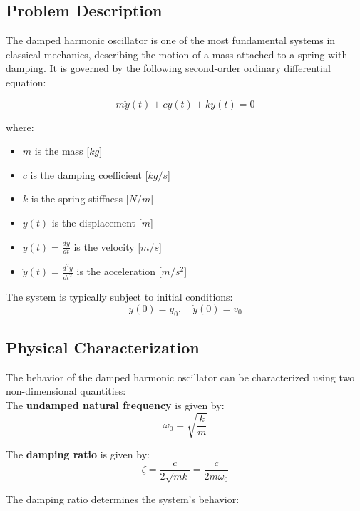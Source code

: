 \documentclass[12pt, a4paper]{report}
\begin{document}
\subsection{Problem Description}

The damped harmonic oscillator is one of the most fundamental systems in classical mechanics, describing the motion of a mass attached to a spring with damping. It is governed by the following second-order ordinary differential equation:

\begin{equation}
m \ddot{y}(t) + c \dot{y}(t) + k y(t) = 0
\end{equation}

where:
\begin{itemize}
    \item $m$ is the mass [$kg$]
    \item $c$ is the damping coefficient [$kg/s$]
    \item $k$ is the spring stiffness [$N/m$]
    \item $y(t)$ is the displacement [$m$]
    \item $\dot{y}(t) = \frac{dy}{dt}$ is the velocity [$m/s$]
    \item $\ddot{y}(t) = \frac{d^2y}{dt^2}$ is the acceleration [$m/s^2$]
\end{itemize}

The system is typically subject to initial conditions:
\begin{equation}
y(0) = y_0, \quad \dot{y}(0) = v_0
\end{equation}

\subsection{Physical Characterization}

\noindent The behavior of the damped harmonic oscillator can be characterized using two non-dimensional quantities:\\

The \textbf{undamped natural frequency} is given by:
\begin{equation}
\omega_0 = \sqrt{\frac{k}{m}}
\end{equation}

The \textbf{damping ratio} is given by:
\begin{equation}
\zeta = \frac{c}{2\sqrt{mk}} = \frac{c}{2m\omega_0}
\end{equation}

\noindent The damping ratio determines the system's behavior:
\end{document}
